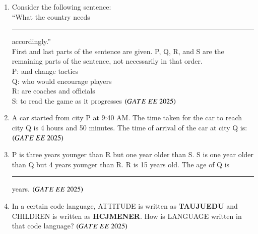 \documentclass[journal,12pt,onecolumn]{IEEEtran}
\theoremstyle{remark}
\begin{document}
\begin{enumerate}
\item Consider the following sentence: \\
``What the country needs \rule{2cm}{0.4pt} accordingly.'' \\
First and last parts of the sentence are given. P, Q, R, and S are the remaining parts of the sentence, not necessarily in that order. \\
P: and change tactics \\
Q: who would encourage players \\
R: are coaches and officials \\
S: to read the game as it progresses
\hfill $\brak{GATE\ EE\ 2025}$
\begin{enumerate}
\end{enumerate}

\item A car started from city P at 9:40 AM. The time taken for the car to reach city Q is 4 hours and 50 minutes. The time of arrival of the car at city Q is:
\hfill $\brak{GATE\ EE\ 2025}$
\begin{enumerate}
\end{enumerate}

\item P is three years younger than R but one year older than S. S is one year older than Q but 4 years younger than R. R is 15 years old. The age of Q is \rule{1cm}{0.4pt} years. 
\hfill $\brak{GATE\ EE\ 2025}$

\item In a certain code language, ATTITUDE is written as \textbf{TAUJUEDU} and CHILDREN is written as \textbf{HCJMENER}. How is LANGUAGE written in that code language?
\hfill $\brak{GATE\ EE\ 2025}$
\begin{enumerate}
\end{enumerate}


\end{enumerate}
\end{document}
